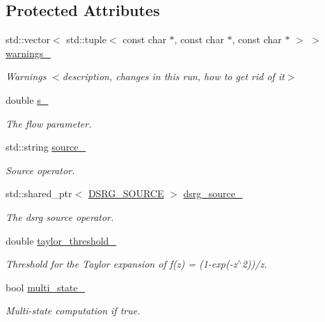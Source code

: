 \subsection*{Protected Attributes}
\begin{DoxyCompactItemize}
\item 
std\+::vector$<$ std\+::tuple$<$ const char $\ast$, const char $\ast$, const char $\ast$ $>$ $>$ \mbox{\hyperlink{classforte_1_1_m_a_s_t_e_r___d_s_r_g_a7e080391fc5e3476ae6f1a3e02eee4d1}{warnings\+\_\+}}
\begin{DoxyCompactList}\small\item\em Warnings $<$description, changes in this run, how to get rid of it$>$ \end{DoxyCompactList}\item 
double \mbox{\hyperlink{classforte_1_1_m_a_s_t_e_r___d_s_r_g_aacd2335c163366faff6cb30d39a3ddf7}{s\+\_\+}}
\begin{DoxyCompactList}\small\item\em The flow parameter. \end{DoxyCompactList}\item 
std\+::string \mbox{\hyperlink{classforte_1_1_m_a_s_t_e_r___d_s_r_g_a4227e753f0f19afc118f122acaa0a71c}{source\+\_\+}}
\begin{DoxyCompactList}\small\item\em Source operator. \end{DoxyCompactList}\item 
std\+::shared\+\_\+ptr$<$ \mbox{\hyperlink{classforte_1_1_d_s_r_g___s_o_u_r_c_e}{D\+S\+R\+G\+\_\+\+S\+O\+U\+R\+CE}} $>$ \mbox{\hyperlink{classforte_1_1_m_a_s_t_e_r___d_s_r_g_a66ed6a268b5014d6f96b646379be58dc}{dsrg\+\_\+source\+\_\+}}
\begin{DoxyCompactList}\small\item\em The dsrg source operator. \end{DoxyCompactList}\item 
double \mbox{\hyperlink{classforte_1_1_m_a_s_t_e_r___d_s_r_g_a8eb02a55fe22194653b6296e2da3a9b9}{taylor\+\_\+threshold\+\_\+}}
\begin{DoxyCompactList}\small\item\em Threshold for the Taylor expansion of f(z) = (1-\/exp(-\/z$^\wedge$2))/z. \end{DoxyCompactList}\item 
bool \mbox{\hyperlink{classforte_1_1_m_a_s_t_e_r___d_s_r_g_ad5636a2563c05195659b59836e54f2c4}{multi\+\_\+state\+\_\+}}
\begin{DoxyCompactList}\small\item\em Multi-\/state computation if true. \end{DoxyCompactList}\item 

\end{DoxyCompactItemize}
